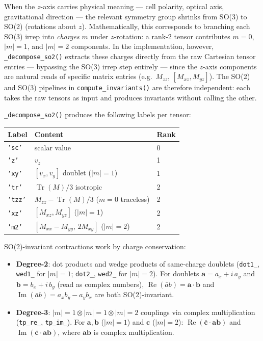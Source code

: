 \documentclass[11pt,a4paper]{article}
\begin{document}
When the $z$-axis carries physical meaning — cell polarity, optical axis,
gravitational direction — the relevant symmetry group shrinks from SO(3)
to SO(2) (rotations about $z$).
Mathematically, this corresponds to branching each SO(3) irrep into
\emph{charges} $m$ under $z$-rotation: a rank-2 tensor contributes
$m=0$, $|m|=1$, and $|m|=2$ components.
In the implementation, however, \texttt{\_decompose\_so2()} extracts these
charges directly from the raw Cartesian tensor entries — bypassing the SO(3)
irrep step entirely — since the $z$-axis components are natural reads of
specific matrix entries (e.g.\ $M_{zz}$, $[M_{xz}, M_{yz}]$).
The SO(2) and SO(3) pipelines in \texttt{compute\_invariants()} are therefore
independent: each takes the raw tensors as input and produces invariants
without calling the other.

\texttt{\_decompose\_so2()} produces the following labels per tensor:

\begin{center}
\begin{tabular}{lll}
\toprule
Label & Content & Rank \\
\midrule
\texttt{'sc'} & scalar value & 0 \\
\texttt{'z'} & $v_z$ & 1 \\
\texttt{'xy'} & $[v_x, v_y]$ doublet ($|m|=1$) & 1 \\
\texttt{'tr'} & $\operatorname{Tr}(M)/3$ isotropic & 2 \\
\texttt{'tzz'} & $M_{zz} - \operatorname{Tr}(M)/3$ ($m=0$ traceless) & 2 \\
\texttt{'xz'} & $[M_{xz}, M_{yz}]$ ($|m|=1$) & 2 \\
\texttt{'m2'} & $[M_{xx}-M_{yy},\, 2M_{xy}]$ ($|m|=2$) & 2 \\
\bottomrule
\end{tabular}
\end{center}

SO(2)-invariant contractions work by charge conservation:
\begin{itemize}
  \item \textbf{Degree-2}: dot products and wedge products of same-charge doublets
        (\texttt{dot1\_}, \texttt{wed1\_} for $|m|=1$; \texttt{dot2\_}, \texttt{wed2\_} for $|m|=2$).
        For doublets $\mathbf{a} = a_x + i\,a_y$ and $\mathbf{b} = b_x + i\,b_y$
        (read as complex numbers), $\operatorname{Re}(\bar{a}b) = \mathbf{a}\cdot\mathbf{b}$
        and $\operatorname{Im}(\bar{a}b) = a_x b_y - a_y b_x$ are both SO(2)-invariant.
  \item \textbf{Degree-3}: $|m|=1 \otimes |m|=1 \otimes |m|=2$ couplings via complex
        multiplication (\texttt{tp\_re\_}, \texttt{tp\_im\_}).
        For $\mathbf{a},\mathbf{b}$ ($|m|=1$) and $\mathbf{c}$ ($|m|=2$):
        $\operatorname{Re}(\bar{\mathbf{c}} \cdot \mathbf{a}\mathbf{b})$ and
        $\operatorname{Im}(\bar{\mathbf{c}} \cdot \mathbf{a}\mathbf{b})$, where
        $\mathbf{a}\mathbf{b}$ is complex multiplication.
\end{itemize}
\end{document}
